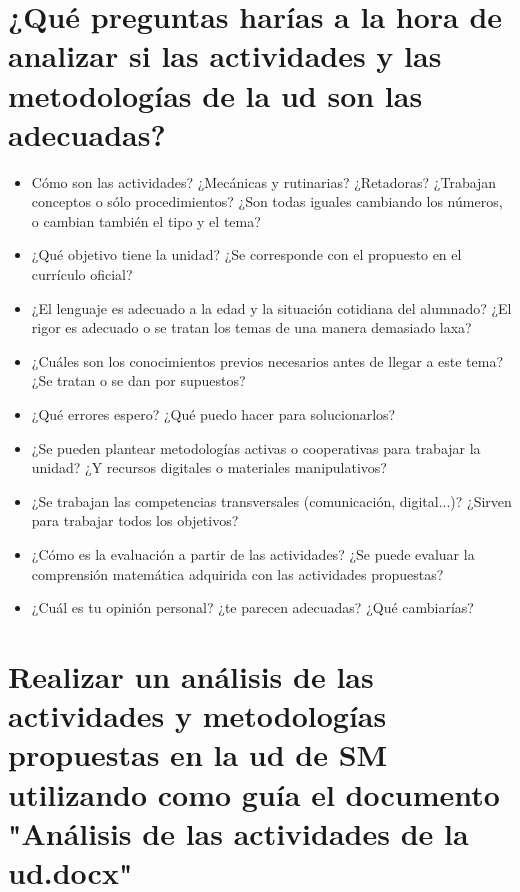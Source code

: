 \newpage\section{¿Qué preguntas harías a la hora de analizar si las actividades y las metodologías de la ud son las adecuadas?}

\begin{itemize}
\item Cómo son las actividades? ¿Mecánicas y rutinarias? ¿Retadoras? ¿Trabajan conceptos o sólo procedimientos? ¿Son todas iguales cambiando los números, o cambian también el tipo y el tema?

\item ¿Qué objetivo tiene la unidad? ¿Se corresponde con el propuesto en el currículo oficial?

\item ¿El lenguaje es adecuado a la edad y la situación cotidiana del alumnado? ¿El rigor es adecuado o se tratan los temas de una manera demasiado laxa?

\item ¿Cuáles son los conocimientos previos necesarios antes de llegar a este tema? ¿Se tratan o se dan por supuestos?

\item ¿Qué errores espero? ¿Qué puedo hacer para solucionarlos?

\item ¿Se pueden plantear metodologías activas o cooperativas para trabajar la unidad? ¿Y recursos digitales o materiales manipulativos?

\item ¿Se trabajan las competencias transversales (comunicación, digital...)? ¿Sirven para trabajar todos los objetivos?

\item ¿Cómo es la evaluación a partir de las actividades? ¿Se puede evaluar la comprensión matemática adquirida con las actividades propuestas?

\item ¿Cuál es tu opinión personal? ¿te parecen adecuadas? ¿Qué cambiarías?
\end{itemize}





\newpage\section{Realizar un análisis de las actividades y metodologías propuestas en la ud de SM utilizando como guía el documento "Análisis de las actividades de la ud.docx"}

